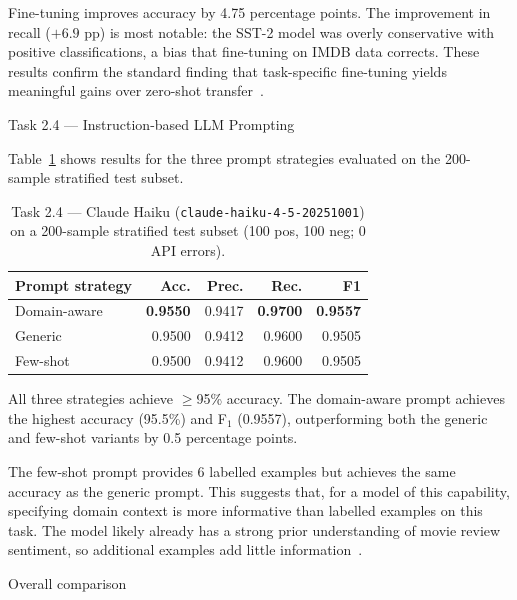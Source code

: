 \documentclass[12pt,reqno,twoside]{amsbook}
\makeatletter
\def\section{\@startsection{section}{1}%
      \z@{.5\linespacing\@plus.7\linespacing}{.25\linespacing}%
      {\normalfont\bfseries\flushleft}}
\def\subsection{\@startsection{subsection}{2}%
      \z@{.5\linespacing\@plus.7\linespacing}{.25\linespacing}%
      {\normalfont\bfseries\flushleft}}
\theoremstyle{plain}
\numberwithin{equation}{chapter}
\numberwithin{section}{chapter}
\makeatother
\begin{document}
\noindent Fine-tuning improves accuracy by 4.75 percentage points.
The improvement in recall ($+6.9$ pp) is most notable: the SST-2 model was
overly conservative with positive classifications, a bias that fine-tuning on
IMDB data corrects.
These results confirm the standard finding that task-specific fine-tuning yields
meaningful gains over zero-shot transfer~\cite{devlin2019,sanh2019}.

\section{Task 2.4 --- Instruction-based LLM Prompting}

\noindent Table~\ref{tab:t24} shows results for the three prompt strategies
evaluated on the 200-sample stratified test subset.

\begin{table}[ht]
\centering
\caption{Task 2.4 --- Claude Haiku (\texttt{claude-haiku-4-5-20251001}) on a
200-sample stratified test subset (100 pos, 100 neg; 0 API errors).}
\label{tab:t24}
\begin{tabular}{lrrrr}
\toprule
Prompt strategy & Acc. & Prec. & Rec. & F1 \\
\midrule
Domain-aware & \textbf{0.9550} & 0.9417 & \textbf{0.9700} & \textbf{0.9557} \\
Generic      & 0.9500          & 0.9412 & 0.9600          & 0.9505 \\
Few-shot     & 0.9500          & 0.9412 & 0.9600          & 0.9505 \\
\bottomrule
\end{tabular}
\end{table}

\noindent All three strategies achieve $\geq$95\% accuracy.
The domain-aware prompt achieves the highest accuracy (95.5\%) and F$_1$ (0.9557),
outperforming both the generic and few-shot variants by 0.5 percentage points.

The few-shot prompt provides 6 labelled examples but achieves the same accuracy
as the generic prompt.
This suggests that, for a model of this capability, specifying domain context is
more informative than labelled examples on this task.
The model likely already has a strong prior understanding of movie review sentiment,
so additional examples add little information~\cite{brown2020}.

\subsection{Overall comparison}
\end{document}
